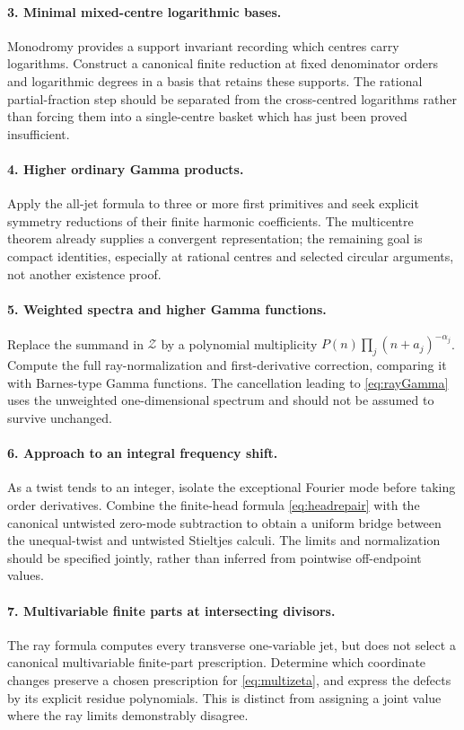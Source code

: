 \documentclass[11pt,a4paper]{article}
\numberwithin{equation}{section}
\theoremstyle{definition}\newtheorem{definition}[theorem]{Definition}
\theoremstyle{remark}\newtheorem{remark}[theorem]{Remark}
\begin{document}
\paragraph{3. Minimal mixed-centre logarithmic bases.}
Monodromy provides a support invariant recording which centres carry
logarithms. Construct a canonical finite reduction at fixed denominator
orders and logarithmic degrees in a basis that retains these supports.
The rational partial-fraction step should be separated from the
cross-centred logarithms rather than forcing them into a single-centre
basket which has just been proved insufficient.

\paragraph{4. Higher ordinary Gamma products.}
Apply the all-jet formula to three or more first primitives and seek
explicit symmetry reductions of their finite harmonic coefficients.
The multicentre theorem already supplies a convergent representation;
the remaining goal is compact identities, especially at rational
centres and selected circular arguments, not another existence proof.

\paragraph{5. Weighted spectra and higher Gamma functions.}
Replace the summand in $\mathcal Z$ by a polynomial multiplicity
$P(n)\prod_j(n+a_j)^{-\alpha_j}$. Compute the full ray-normalization
and first-derivative correction, comparing it with Barnes-type Gamma
functions. The cancellation leading to \eqref{eq:rayGamma} uses the
unweighted one-dimensional spectrum and should not be assumed to
survive unchanged.

\paragraph{6. Approach to an integral frequency shift.}
As a twist tends to an integer, isolate the exceptional Fourier mode
before taking order derivatives. Combine the finite-head formula
\eqref{eq:headrepair} with the canonical untwisted zero-mode subtraction
to obtain a uniform bridge between the unequal-twist and untwisted
Stieltjes calculi. The limits and normalization should be specified
jointly, rather than inferred from pointwise off-endpoint values.

\paragraph{7. Multivariable finite parts at intersecting divisors.}
The ray formula computes every transverse one-variable jet, but does
not select a canonical multivariable finite-part prescription. Determine
which coordinate changes preserve a chosen prescription for
\eqref{eq:multizeta}, and express the defects by its explicit residue
polynomials. This is distinct from assigning a joint value where the
ray limits demonstrably disagree.
\end{document}
